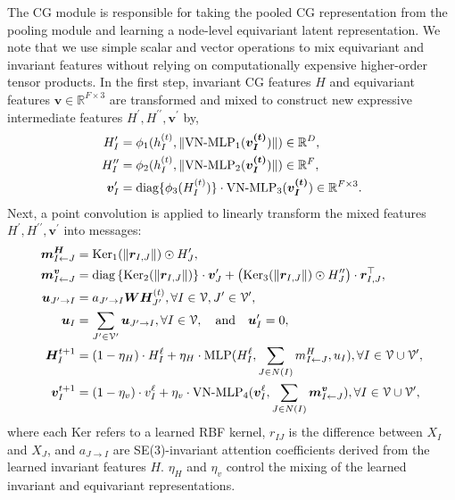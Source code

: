 The CG module is responsible for taking the pooled CG representation from the pooling module and learning a node-level equivariant latent representation.
We note that we use simple scalar and vector operations to mix equivariant and invariant features without relying on computationally expensive higher-order tensor products.
In the first step, invariant CG features $H$ and equivariant features $\bm{v}\in\mathbb{R}^{F\times 3}$ are transformed and mixed to construct new expressive intermediate features $H^{\prime}, H^{\prime\prime}, \bm{v}^{\prime}$ by,
\begin{subequations}
\begin{align}
H^{\prime}_I &= \phi_{1}(h^{(t)}_I, \lVert\text{VN-MLP}_{1}(\bm{v^{(t)}_I})\rVert)\in\mathbb{R}^{D} \label{eqn-a},\\ 
H^{\prime\prime}_I&=\phi_{2}(h^{(t)}_I, \lVert\text{VN-MLP}_{2}(\bm{v^{(t)}_I})\rVert)\in\mathbb{R}^{F}\label{eqn-b},\\
\bm{v}^{\prime}_I &=\text{diag}\{\phi_{3}(H^{(t)}_I)\}\cdot\text{VN-MLP}_{3}(\bm{v^{(t)}_I})\in \mathbb{R}^{F\times 3}.\label{eqn-c}
\end{align}
\label{mixed features}
\end{subequations}
Next, a point convolution \citep{tensor-field-network, painn, 3dlinker} is applied to linearly transform the mixed features $H^{\prime},H^{\prime\prime},\bm{v}^{\prime}$ into messages:
\begin{subequations}
\begin{align}
\bm{m^H}_{I\leftarrow J} &= \text{Ker}_{1}(\lVert\bm{r}_{I,J}\rVert)\odot H^{\prime}_J\label{eqn-d}, \\
\bm{m^v}_{I\leftarrow J}&=  \text{diag}\left\{\text{Ker}_{2}(\lVert\bm{r}_{I,J}\rVert)\right\} \cdot \bm{v}^{\prime}_J  +\big(\text{Ker}_{3}(\lVert\bm{r}_{I,J}\rVert)\odot H^{\prime\prime}_{J}\big)\cdot\bm{r}^{\top}_{I,J}\label{eqn-e}, \\
\bm{u}_{J'\to I} &= a_{J'\to I} \bm{W} \bm{H}_{J'}^{(t)},\forall I\in{\mathcal{V}},J'\in{\mathcal{V}}', \\
\bm{u}_{I} &=  \sum_{J'\in{\mathcal{V}}'}\bm{u}_{J'\to I},\forall I \in{\mathcal{V}}, \quad \text{and} \quad \bm{u}'_{I} =  0, \\
\bm{H}^{t+1}_{I}& = (1 - \eta_H) \cdot H^{\ell}_I+ \eta_H \cdot\text{MLP}(H^{\ell}_I, \sum_{J\in N(I)}m^H_{I\leftarrow J}, u_{I}),\forall I\in{\mathcal{V}}\cup{\mathcal{V}}' \label{agg-h},\\
\bm{v}^{t+1}_{I} &= (1 - \eta_v) \cdot v^{\ell}_I + \eta_v \cdot \text{VN-MLP}_{4}(\bm{v}^{\ell}_I, \sum_{J\in N(I)}\bm{m^v}_{I\leftarrow J}),\forall I\in{\mathcal{V}}\cup{\mathcal{V}}'\label{agg-v},
\end{align}
\label{message function}
\end{subequations}
where each Ker refers to a learned RBF kernel, $r_{IJ}$ is the difference between $X_I$ and $X_J$, and $a_{J\to I}$ are SE(3)-invariant attention coefficients derived from the learned invariant features $H$. $\eta_H$ and $\eta_v$ control the mixing of the learned invariant and equivariant representations.

